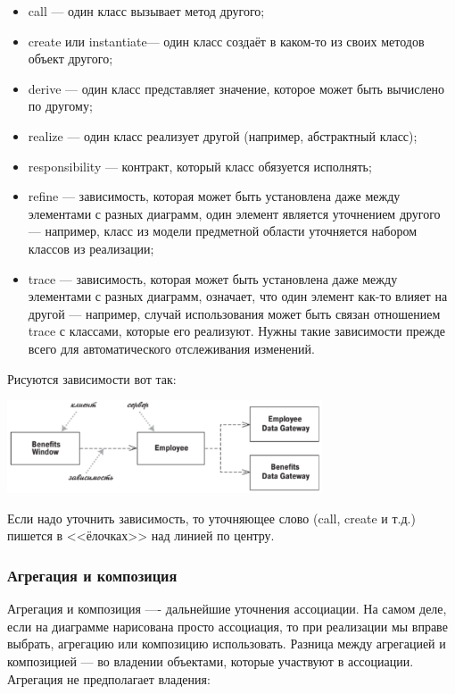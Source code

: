\documentclass{../../text-style}
\begin{document}
\begin{itemize}
    \item call --- один класс вызывает метод другого;
    \item create или instantiate--- один класс создаёт в каком-то из своих методов объект другого;
    \item derive --- один класс представляет значение, которое может быть вычислено по другому;
    \item realize --- один класс реализует другой (например, абстрактный класс);
    \item responsibility --- контракт, который класс обязуется исполнять;
    \item refine --- зависимость, которая может быть установлена даже между элементами с разных диаграмм, один элемент является уточнением другого --- например, класс из модели предметной области уточняется набором классов из реализации;
    \item trace --- зависимость, которая может быть установлена даже между элементами с разных диаграмм, означает, что один элемент как-то влияет на другой --- например, случай использования может быть связан отношением trace с классами, которые его реализуют. Нужны такие зависимости прежде всего для автоматического отслеживания изменений.
\end{itemize}

Рисуются зависимости вот так:

\begin{center}
    \includegraphics[width=0.7\textwidth]{dependencies.png}
\end{center}

Если надо уточнить зависимость, то уточняющее слово (call, create и т.д.) пишется в <<ёлочках>> над линией по центру.

\subsubsection{Агрегация и композиция}

Агрегация и композиция ---- дальнейшие уточнения ассоциации. На самом деле, если на диаграмме нарисована просто ассоциация, то при реализации мы вправе выбрать, агрегацию или композицию использовать. Разница между агрегацией и композицией --- во владении объектами, которые участвуют в ассоциации. Агрегация не предполагает владения:
\end{document}
